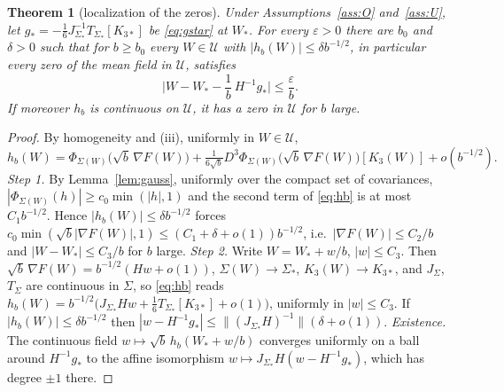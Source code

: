 \documentclass[10pt]{article}
\newtheorem{theorem}{Theorem}
\theoremstyle{definition}
\theoremstyle{remark}
\begin{document}
\begin{theorem}[localization of the zeros]\label{thm:state}
Under Assumptions~\ref{ass:O} and~\ref{ass:U}, let $g_\ast=-\frac16J_{\Sigma_\ast}^{-1}T_{\Sigma_\ast}[K_{3\ast}]$ be
\eqref{eq:gstar} at $W_\ast$. For every $\varepsilon>0$ there are $b_0$ and $\delta>0$ such that for $b\ge b_0$ every
$W\in\mathcal U$ with $|h_b(W)|\le\delta b^{-1/2}$, in particular every zero of the mean field in $\mathcal U$, satisfies
\[
\Big|W-W_\ast-\frac1b\,H^{-1}g_\ast\Big|\le\frac\varepsilon b .
\]
If moreover $h_b$ is continuous on $\mathcal U$, it has a zero in $\mathcal U$ for $b$ large.
\end{theorem}
\begin{proof}
By homogeneity and (iii), uniformly in $W\in\mathcal U$,
\begin{equation}\label{eq:hb}
h_b(W)=\Phi_{\Sigma(W)}\big(\sqrt b\,\nabla F(W)\big)+\tfrac1{6\sqrt b}D^3\Phi_{\Sigma(W)}\big(\sqrt b\,\nabla F(W)\big)[K_3(W)]+o(b^{-1/2}).
\end{equation}
\emph{Step 1.} By Lemma~\ref{lem:gauss}, uniformly over the compact set of covariances,
$|\Phi_{\Sigma(W)}(h)|\ge c_0\min(|h|,1)$ and the second term of \eqref{eq:hb} is at most $C_1b^{-1/2}$. Hence
$|h_b(W)|\le\delta b^{-1/2}$ forces $c_0\min(\sqrt b|\nabla F(W)|,1)\le(C_1+\delta+o(1))b^{-1/2}$, i.e.\
$|\nabla F(W)|\le C_2/b$ and $|W-W_\ast|\le C_3/b$ for $b$ large. \emph{Step 2.} Write $W=W_\ast+w/b$, $|w|\le C_3$. Then
$\sqrt b\,\nabla F(W)=b^{-1/2}(Hw+o(1))$, $\Sigma(W)\to\Sigma_\ast$, $K_3(W)\to K_{3\ast}$, and $J_\Sigma$, $T_\Sigma$ are
continuous in $\Sigma$, so \eqref{eq:hb} reads $h_b(W)=b^{-1/2}\big(J_{\Sigma_\ast}Hw+\frac16T_{\Sigma_\ast}[K_{3\ast}]+o(1)\big)$,
uniformly in $|w|\le C_3$. If $|h_b(W)|\le\delta b^{-1/2}$ then $|w-H^{-1}g_\ast|\le\|(J_{\Sigma_\ast}H)^{-1}\|(\delta+o(1))$.
\emph{Existence.} The continuous field $w\mapsto\sqrt b\,h_b(W_\ast+w/b)$ converges uniformly on a ball around
$H^{-1}g_\ast$ to the affine isomorphism $w\mapsto J_{\Sigma_\ast}H(w-H^{-1}g_\ast)$, which has degree $\pm1$ there.
\end{proof}
\end{document}
